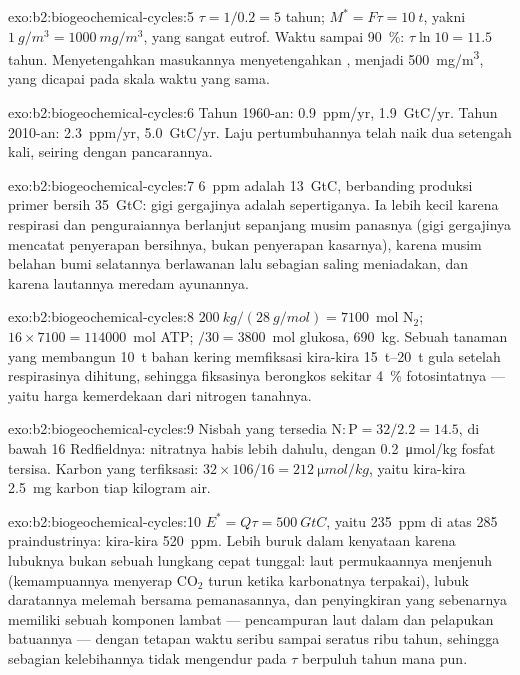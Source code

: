 \begin{solution}{exo:b2:biogeochemical-cycles:5}
$\tau = 1/0.2 = 5$ tahun; $M^{*} = F\tau = \qty{10}{t}$, yakni
$\qty{1}{g/m^3} = \qty{1000}{mg/m^3}$, yang sangat eutrof. Waktu sampai
\qty{90}{\%}: $\tau\ln 10 = 11.5$ tahun. Menyetengahkan masukannya
menyetengahkan , menjadi \qty{500}{mg/m^3}, yang
dicapai pada skala waktu yang sama.
\end{solution}

\begin{solution}{exo:b2:biogeochemical-cycles:6}
Tahun 1960-an: \qty{0.9}{ppm/yr}, \qty{1.9}{GtC/yr}. Tahun 2010-an:
\qty{2.3}{ppm/yr}, \qty{5.0}{GtC/yr}. Laju pertumbuhannya telah naik
dua setengah kali, seiring dengan pancarannya.
\end{solution}

\begin{solution}{exo:b2:biogeochemical-cycles:7}
\qty{6}{ppm} adalah \qty{13}{GtC}, berbanding produksi primer bersih
\qty{35}{GtC}: gigi gergajinya adalah sepertiganya. Ia lebih kecil
karena respirasi dan penguraiannya berlanjut sepanjang musim panasnya
(gigi gergajinya mencatat penyerapan bersihnya, bukan penyerapan
kasarnya), karena musim belahan bumi selatannya berlawanan lalu
sebagian saling meniadakan, dan karena lautannya meredam ayunannya.
\end{solution}

\begin{solution}{exo:b2:biogeochemical-cycles:8}
$\qty{200}{kg}/(\qty{28}{g/mol}) = 7100$~mol $\mathrm{N_2}$; $16\times
7100 = \num{114000}$~mol ATP; $/30 = 3800$~mol glukosa, \qty{690}{kg}.
Sebuah tanaman yang membangun \qty{10}{t} bahan kering memfiksasi
kira-kira \qtyrange{15}{20}{t} gula setelah respirasinya dihitung,
sehingga fiksasinya berongkos sekitar \qty{4}{\%} fotosintatnya ---
yaitu harga kemerdekaan dari nitrogen tanahnya.
\end{solution}

\begin{solution}{exo:b2:biogeochemical-cycles:9}
Nisbah yang tersedia $\mathrm{N:P} = 32/2.2 = 14.5$, di bawah 16
Redfieldnya: nitratnya habis lebih dahulu, dengan
\qty{0.2}{\micro mol/kg} fosfat tersisa. Karbon yang terfiksasi:
$32\times 106/16 =
\qty{212}{\micro mol/kg}$, yaitu kira-kira
\qty{2.5}{mg} karbon tiap kilogram air.
\end{solution}

\begin{solution}{exo:b2:biogeochemical-cycles:10}
$E^{*} = Q\tau = \qty{500}{GtC}$, yaitu \qty{235}{ppm} di atas 285
praindustrinya: kira-kira \qty{520}{ppm}. Lebih buruk dalam kenyataan
karena lubuknya bukan sebuah lungkang cepat tunggal: laut permukaannya
menjenuh (kemampuannya menyerap $\mathrm{CO_2}$ turun ketika karbonatnya
terpakai), lubuk daratannya melemah bersama pemanasannya, dan
penyingkiran yang sebenarnya memiliki sebuah komponen lambat ---
pencampuran laut dalam dan pelapukan batuannya --- dengan tetapan waktu
seribu sampai seratus ribu tahun, sehingga sebagian kelebihannya tidak
mengendur pada $\tau$ berpuluh tahun mana pun.
\end{solution}

